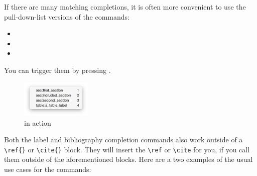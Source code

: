 \documentclass[11pt, x11names]{article}
\begin{document}
If there are many matching completions, it is often more convenient to use the pull-down-list versions of the commands:

\begin{itemize}
  \item {}
  \item {}
  \item {}
\end{itemize}

You can trigger them by pressing \keys{\Alt + \esc}.

\begin{figure}[h]
  \centering
    \includegraphics[width=0.3\textwidth]{Figures/Label Completion}
  \caption{ in action}
  \label{fig:Figures_Label_Completion}
\end{figure}

Both the label and bibliography completion commands also work outside of a \texttt{\textbackslash{}ref\{\}} or \texttt{\textbackslash{}cite\{\}} block. They will insert the \texttt{\textbackslash{}ref} or \texttt{\textbackslash{}cite} for you, if you call them outside of the aforementioned blocks. Here are a two examples of the usual use cases for the commands:
\end{document}
